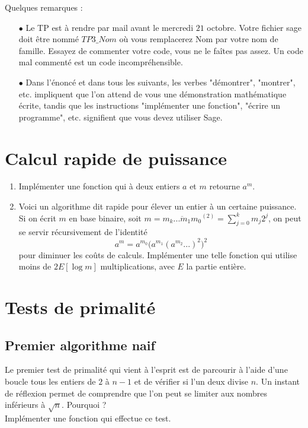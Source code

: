 Quelques remarques :
\begin{itemize}
\item[$\bullet$] Le TP est à rendre par mail avant le mercredi $21$ octobre. Votre fichier sage doit être nommé $TP3\_Nom$ où vous remplacerez Nom par votre nom de famille. Essayez de commenter votre code, vous ne le faîtes pas assez. Un code mal commenté est un code incompréhensible.
\item[$\bullet$] Dans l'énoncé et dans tous les suivants, les verbes "démontrer", "montrer", etc. impliquent que l'on attend de vous une démonstration mathématique écrite, tandis que les instructions "implémenter une fonction", "écrire un programme", etc. signifient que vous devez utiliser Sage.
\end{itemize}

\section{Calcul rapide de puissance}

\begin{enumerate}
\item Implémenter une fonction qui à deux entiers $a$ et $m$ retourne $a^m$.
\item Voici un algorithme dit rapide pour élever un entier à un certaine puissance. Si on écrit $m$ en base binaire, soit $m=\overline{m_k ... m_1 m_0}^{(2)} = \sum_{j=0}^k m_j 2^j$, on peut se servir récursivement de l'identité
\[a^m = a^{m_0 }\big(a^{m_1}(a^{m_2}...)^2\big)^2\]
pour diminuer les coûts de calculs. Implémenter une telle fonction qui utilise moins de $2 E[\log m]$ multiplications, avec $E$ la partie entière.
\end{enumerate}

\section{Tests de primalité}

\subsection{Premier algorithme naif} 
Le premier test de primalité qui vient à l'esprit est de parcourir à l'aide d'une boucle tous les entiers de $2$ à $n-1$ et de vérifier si l'un deux divise $n$. Un instant de réflexion permet de comprendre que l'on peut se limiter aux nombres inférieurs à $\sqrt n$. Pourquoi ?\\ 
Implémenter une fonction qui effectue ce test.

